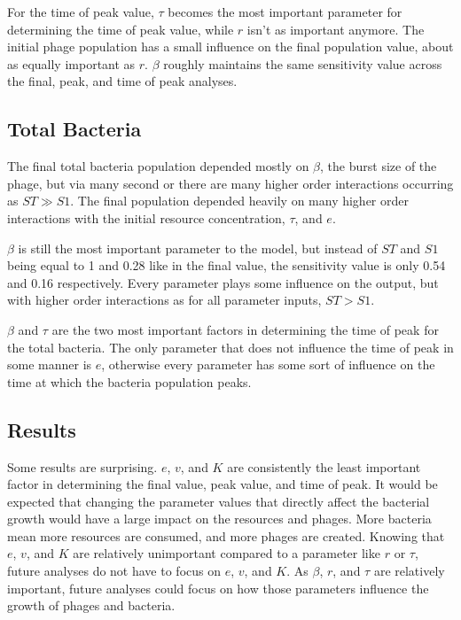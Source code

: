 For the time of peak value, $\tau$ becomes the most important parameter for determining the time of peak value, while $r$ isn't as important anymore. 
The initial phage population has a small influence on the final population value, about as equally important as $r$. 
$\beta$ roughly maintains the same sensitivity value across the final, peak, and time of peak analyses. 

\subsection{Total Bacteria}
The final total bacteria population depended mostly on $\beta$, the burst size of the phage, but via many second or there are many higher order interactions occurring as $ST \gg S1$. 
The final population depended heavily on many higher order interactions with the initial resource concentration, $\tau$, and $e$. 

$\beta$ is still the most important parameter to the model, but instead of $ST$ and $S1$ being equal to 1 and 0.28 like in the final value, the sensitivity value is only 0.54 and 0.16 respectively. 
Every parameter plays some influence on the output, but with higher order interactions as for all parameter inputs, $ST > S1$. 

$\beta$ and $\tau$ are the two most important factors in determining the time of peak for the total bacteria. 
The only parameter that does not influence the time of peak in some manner is $e$, otherwise every parameter has some sort of influence on the time at which the bacteria population peaks. 

\subsection{Results}
Some results are surprising. 
$e$, $v$, and $K$ are consistently the least important factor in determining the final value, peak value, and time of peak. 
It would be expected that changing the parameter values that directly affect the bacterial growth would have a large impact on the resources and phages. 
More bacteria mean more resources are consumed, and more phages are created. 
Knowing that $e$, $v$, and $K$ are relatively unimportant compared to a parameter like $r$ or $\tau$, future analyses do not have to focus on $e$, $v$, and $K$. 
As $\beta$, $r$, and $\tau$ are relatively important, future analyses could focus on how those parameters influence the growth of phages and bacteria. 


